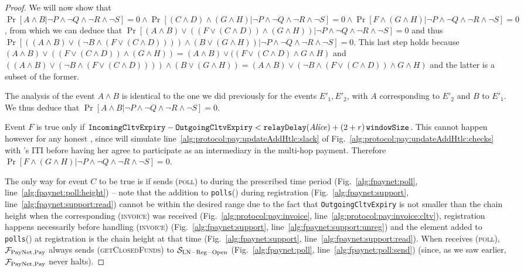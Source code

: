 \begin{proof}
  We will now show that $\Pr[A \wedge B | \neg P \wedge \neg Q \wedge \neg R
  \wedge \neg S] = 0 \wedge \Pr[(C \wedge D) \wedge (G \wedge H) | \neg P \wedge
  \neg Q \wedge \neg R \wedge \neg S] = 0 \wedge \Pr[F \wedge (G \wedge H) |
  \neg P \wedge \neg Q \wedge \neg R \wedge \neg S] = 0$, from which we can
  deduce that $\Pr[(A \wedge B) \vee ((F \vee (C \wedge D)) \wedge (G \wedge H))
  | \neg P \wedge \neg Q \wedge \neg R \wedge \neg S] = 0$ and thus $\Pr[((A
  \wedge B) \vee (\neg B \wedge (F \vee (C \wedge D)))) \wedge (B \vee (G \wedge
  H)) | \neg P \wedge \neg Q \wedge \neg R \wedge \neg S] = 0$. This last step
  holds because $(A \wedge B) \vee ((F \vee (C \wedge D)) \wedge (G \wedge H)) =
  (A \wedge B) \vee ((F \vee (C \wedge D) \wedge G \wedge H)$ and $((A \wedge B)
  \vee (\neg B \wedge (F \vee (C \wedge D)))) \wedge (B \vee (G \wedge H)) = (A
  \wedge B) \vee (\neg B \wedge (F \vee (C \wedge D)) \wedge G \wedge H)$ and
  the latter is a subset of the former.

  The analysis of the event $A \wedge B$ is identical to the one we did
  previously for the events $E'_1, E'_2$, with $A$ corresponding to $E'_2$ and
  $B$ to $E'_1$. We thus deduce that $\Pr[A \wedge B | \neg P \wedge \neg Q
  \wedge \neg R \wedge \neg S] = 0$.

  Event $F$ is true only if $\mathtt{IncomingCltvExpiry} -
  \mathtt{OutgoingCltvExpiry} < \mathtt{relayDelay}(\mathit{Alice}) + \left(2 + r\right)\texttt{windowSize}$. This
  cannot happen however for any honest \alice, since \simulator{} will simulate
  line~\ref{alg:protocol:pay:updateAddHtlc:slack} of
  Fig.~\ref{alg:protocol:pay:updateAddHtlc:checks} with \alice's ITI before
  having her agree to participate as an intermediary in the multi-hop payment.
  Therefore $\Pr[F \wedge (G \wedge H) | \neg P \wedge \neg Q \wedge \neg R
  \wedge \neg S] = 0$.

  The only way for event $C$ to be true is if \environment{} sends
  (\textsc{poll}) to \dave{} during the prescribed time period
  (Fig.~\ref{alg:fpaynet:poll}, line~\ref{alg:fpaynet:poll:height}) -- note that
  the addition to \texttt{polls}(\dave) during registration
  (Fig.~\ref{alg:fpaynet:support}, line~\ref{alg:fpaynet:support:read}) cannot
  be within the desired range due to the fact that \texttt{OutgoingCltvExpiry}
  is not smaller than the chain height when the corresponding (\textsc{invoice})
  was received (Fig.~\ref{alg:protocol:pay:invoice},
  line~\ref{alg:protocol:pay:invoice:cltv}), registration happens necessarily
  before handling (\textsc{invoice}) (Fig.~\ref{alg:fpaynet:support},
  line~\ref{alg:fpaynet:support:unreg}) and the element added to
  \texttt{polls}(\dave) at registration is the chain height at that time
  (Fig.~\ref{alg:fpaynet:support}, line~\ref{alg:fpaynet:support:read}). When
  \dave{} receives (\textsc{poll}), $\mathcal{F}_{\mathrm{PayNet}}{}_{\mathrm{, Pay}}$ always sends
  (\textsc{getClosedFunds}) to $\mathcal{S}_{\mathrm{LN - Reg - Open}}$
  (Fig.~\ref{alg:fpaynet:poll}, line~\ref{alg:fpaynet:poll:send}) (since, as we
  saw earlier, $\mathcal{F}_{\mathrm{PayNet}}{}_{\mathrm{, Pay}}$ never halts).


\end{proof}

